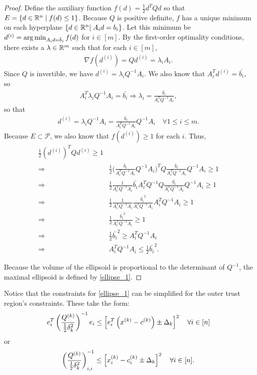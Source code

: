 \documentclass{article}
\begin{document}
\pagebreak
\begin{proof}

Define the auxiliary function $f(d) = \frac 1 2 d^T Q d$ so that $E = \{ d \in \mathbb R^n\; | \; f(d) \le 1 \}$.
Because $Q$ is positive definite, $f$ has a unique minimum on each hyperplane $\left\{d \in \mathbb R^n | \; A_i d = b_i\right\}$.
Let this minimum be $d^{(i)} = \operatorname*{arg\,min}_{A_id =\bar{b}_i} f(d)$ for $i\in[m]$.
By the first-order optimality conditions, there exists a $\lambda \in \mathbb R^m$ such that for each $i\in[m]$,
\begin{align*}
\nabla f(d^{(i)}) = Q d^{(i)} = \lambda_i A_i.
\end{align*}
Since $Q$ is invertible, we have $d^{(i)} = \lambda_i Q^{-1}A_i$. 
We also know that $A_i^T d^{(i)} = \bar{b_i}$, so 
\begin{align*}
A_i^T \lambda_i Q^{-1}A_i = \bar{b_i} \Longrightarrow
\lambda_i = \frac {\bar{b_i}}{A_i^T  Q^{-1}A_i},
\end{align*}
so that
\begin{align*}
d^{(i)} = \lambda_i Q^{-1}A_i = \frac {\bar{b_i}}{A_i^T  Q^{-1}A_i}  Q^{-1}A_i \quad \forall 1\le i\le m.
\end{align*}
Because $E \subset \mathcal{P}$, we also know that $f(d^{(i)}) \ge 1$ for each $i$. Thus,
\begin{align*}
\frac 1 2 (d^{(i)})^{T} Q d^{(i)} \ge 1 \\
\Longrightarrow & \frac 1 2 \bigg(\frac {\bar{b}_i}{A_i^T  Q^{-1}A_i}  Q^{-1}A_i\bigg)^{T} Q \frac {\bar{b}_i}{A_i^T  Q^{-1}A_i}  Q^{-1}A_i \ge 1 \\
\Longrightarrow & \frac 1 2 \frac {1}{A_i^T  Q^{-1}A_i}  \bar{b_i} A_i^T Q^{-1} Q \frac {\bar{b_i}}{A_i^T  Q^{-1}A_i}  Q^{-1}A_i \ge 1 \\
\Longrightarrow & \frac 1 2 \frac {1}{A_i^T  Q^{-1}A_i}  \frac {\bar{b_i}^2}{A_i^T  Q^{-1}A_i}  A_i^T Q^{-1}A_i \ge 1 \\
\Longrightarrow & \frac 1 2  \frac {\bar{b_i}^2}{A_i^T  Q^{-1}A_i} \ge 1 \\
\Longrightarrow & \frac 1 2 \bar{b_i}^2\ge A_i^T  Q^{-1}A_i \\
\Longrightarrow & A_i^T  Q^{-1}A_i \le \frac 1 2 \bar{b_i}^2.
\end{align*}

Because the volume of the ellipsoid is proportional to the determinant of $Q^{-1}$, the maximal ellipsoid is defined by \cref{ellipse_1}.
\end{proof}


Notice that the constraints for \cref{ellipse_1} can be simplified for the outer trust region's constraints.
These take the form:
\begin{align*}
e_i^T\left(\frac{{Q^{(k)}}}{\frac 1 2 \delta_k^2}\right)^{-1} e_i \le \left[e_i^T\left(x^{(k)} - c^{(k)}\right) \pm \Delta_k \right]^2 \quad \forall i \in [n]
\end{align*}
or
\begin{align}
\label{ellipsoids_trust_region_constraints}
\left(\frac{{Q^{(k)}}}{\frac 1 2 \delta_k^2}\right)_{i,i}^{-1} \le \left[x_i^{(k)} - c^{(k)}_i \pm \Delta_k \right]^2 \quad \forall i \in [n].
\end{align}
\end{document}
